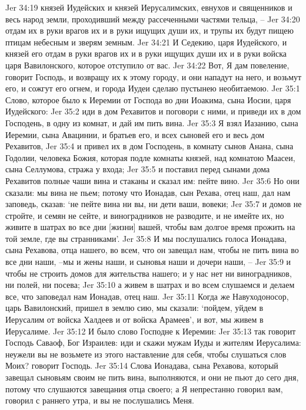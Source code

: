 Jer 34:19  князей Иудейских и князей Иерусалимских, евнухов и священников и весь народ земли, проходивший между рассеченными частями тельца, --
Jer 34:20  отдам их в руки врагов их и в руки ищущих души их, и трупы их будут пищею птицам небесным и зверям земным.
Jer 34:21  И Седекию, царя Иудейского, и князей его отдам в руки врагов их и в руки ищущих души их и в руки войска царя Вавилонского, которое отступило от вас.
Jer 34:22  Вот, Я дам повеление, говорит Господь, и возвращу их к этому городу, и они нападут на него, и возьмут его, и сожгут его огнем, и города Иудеи сделаю пустынею необитаемою.
Jer 35:1  Слово, которое было к Иеремии от Господа во дни Иоакима, сына Иосии, царя Иудейского:
Jer 35:2  иди в дом Рехавитов и поговори с ними, и приведи их в дом Господень, в одну из комнат, и дай им пить вина.
Jer 35:3  Я взял Иазанию, сына Иеремии, сына Авацинии, и братьев его, и всех сыновей его и весь дом Рехавитов,
Jer 35:4  и привел их в дом Господень, в комнату сынов Анана, сына Годолии, человека Божия, которая подле комнаты князей, над комнатою Маасеи, сына Селлумова, стража у входа;
Jer 35:5  и поставил перед сынами дома Рехавитов полные чаши вина и стаканы и сказал им: пейте вино.
Jer 35:6  Но они сказали: мы вина не пьем; потому что Ионадав, сын Рехава, отец наш, дал нам заповедь, сказав: `не пейте вина ни вы, ни дети ваши, вовеки;
Jer 35:7  и домов не стройте, и семян не сейте, и виноградников не разводите, и не имейте их, но живите в шатрах во все дни [жизни] вашей, чтобы вам долгое время прожить на той земле, где вы странниками'.
Jer 35:8  И мы послушались голоса Ионадава, сына Рехавова, отца нашего, во всем, что он завещал нам, чтобы не пить вина во все дни наши, --мы и жены наши, и сыновья наши и дочери наши, --
Jer 35:9  и чтобы не строить домов для жительства нашего; и у нас нет ни виноградников, ни полей, ни посева;
Jer 35:10  а живем в шатрах и во всем слушаемся и делаем все, что заповедал нам Ионадав, отец наш.
Jer 35:11  Когда же Навуходоносор, царь Вавилонский, пришел в землю сию, мы сказали: `пойдем, уйдем в Иерусалим от войска Халдеев и от войска Арамеев', и вот, мы живем в Иерусалиме.
Jer 35:12  И было слово Господне к Иеремии:
Jer 35:13  так говорит Господь Саваоф, Бог Израилев: иди и скажи мужам Иуды и жителям Иерусалима: неужели вы не возьмете из этого наставление для себя, чтобы слушаться слов Моих? говорит Господь.
Jer 35:14  Слова Ионадава, сына Рехавова, который завещал сыновьям своим не пить вина, выполняются, и они не пьют до сего дня, потому что слушаются завещания отца своего; а Я непрестанно говорил вам, говорил с раннего утра, и вы не послушались Меня.
